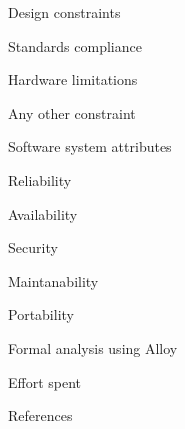 \documentclass{article}
\begin{document}
\begin{legal}
\begin{legal}
		\item Design constraints
			\begin{legal}
			\item Standards compliance
			\item Hardware limitations
			\item Any other constraint
  			\end{legal}
		\item Software system attributes
			\begin{legal}
			\item Reliability
			\item Availability
			\item Security
			\item Maintanability
			\item Portability
  			\end{legal}
  		\end{legal}
	\item Formal analysis using Alloy
  	\item Effort spent
	\item References
	\end{legal}
\end{document}
